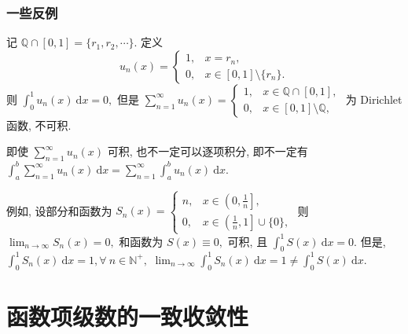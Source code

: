\begin{frame}
\frametitle{一些反例}

\begin{eg}[函数项级数不保持可积性]
记 $\mathbb{Q} \cap [0, 1] = \{r_1, r_2, \cdots\}.$ 定义
\[
u_n(x) = \begin{cases}1, & x = r_n, \\ 0, & x \in [0, 1] \setminus \{r_n\}.\end{cases}
\]
则 $\int_0^1 u_n(x) ~ \mathrm{d}x = 0,$ 但是 $\sum_{n=1}^\infty u_n(x) = \begin{cases}1, & x \in \mathbb{Q} \cap [0, 1], \\ 0, & x \in [0, 1] \setminus \mathbb{Q},\end{cases}$ 为 Dirichlet 函数, 不可积.
\end{eg}

\pause

\begin{eg}[函数项级数不能逐项积分]
即使 $\sum_{n=1}^\infty u_n(x)$ 可积, 也不一定可以逐项积分, 即不一定有 $\int_a^b \sum_{n=1}^\infty u_n(x) ~ \mathrm{d}x = \sum_{n=1}^\infty \int_a^b u_n(x) ~ \mathrm{d}x.$

\pause

例如, 设部分和函数为 $S_n(x) = \begin{cases} n, & x \in \left( 0, \frac{1}{n} \right], \\ 0, & x \in \left( \frac{1}{n}, 1 \right] \cup \{0\}, \end{cases}$ 则 $\lim_{n \to \infty} S_n(x) = 0,$ 和函数为 $S(x) \equiv 0,$ 可积, 且 $\int_0^1 S(x) ~ \mathrm{d}x = 0.$
\pause
但是, $\int_0^1 S_n(x) ~ \mathrm{d}x = 1, \forall ~ n \in \mathbb{N}^+,$ $\lim_{n \to \infty} \int_0^1 S_n(x) ~ \mathrm{d}x = 1 \neq \int_0^1 S(x) ~ \mathrm{d}x.$
\end{eg}

\end{frame}


\section{函数项级数的一致收敛性}


